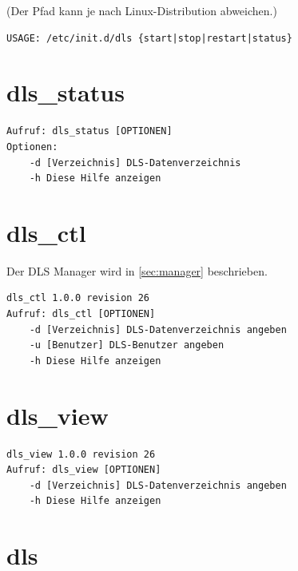 \documentclass[a4paper,12pt,BCOR6mm,bibtotoc,idxtotoc]{scrbook}
\begin{document}
(Der Pfad kann je nach Linux-Distribution abweichen.)

\begin{lstlisting}
USAGE: /etc/init.d/dls {start|stop|restart|status}
\end{lstlisting}


\section{dls\_status}

\begin{lstlisting}
Aufruf: dls_status [OPTIONEN]
Optionen:
    -d [Verzeichnis] DLS-Datenverzeichnis
    -h Diese Hilfe anzeigen
\end{lstlisting}


\section{dls\_ctl}
\label{sec:apx_cmd_dlsctl}

Der DLS Manager wird in \autoref{sec:manager} beschrieben.

\begin{lstlisting}
dls_ctl 1.0.0 revision 26
Aufruf: dls_ctl [OPTIONEN]
    -d [Verzeichnis] DLS-Datenverzeichnis angeben
    -u [Benutzer] DLS-Benutzer angeben
    -h Diese Hilfe anzeigen
\end{lstlisting}


\section{dls\_view}

\begin{lstlisting}
dls_view 1.0.0 revision 26
Aufruf: dls_view [OPTIONEN]
    -d [Verzeichnis] DLS-Datenverzeichnis angeben
    -h Diese Hilfe anzeigen
\end{lstlisting}


\section{dls}
\label{sec:apx_cmd_dls}
\end{document}
